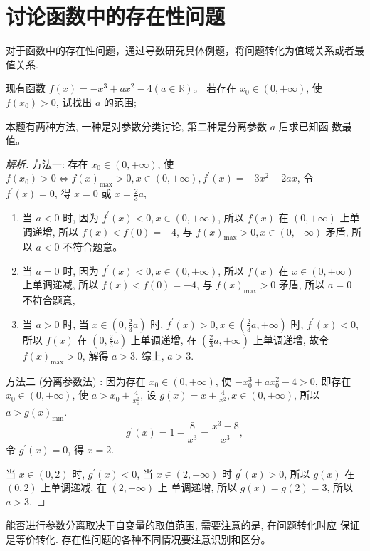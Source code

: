 \section{讨论函数中的存在性问题}

对于函数中的存在性问题，通过导数研究具体例题，将问题转化为值域关系或者最值关系.

\begin{example}
  现有函数 $f(x)=-x^{3}+a x^{2}-4(a \in \mathbb{R})$。 若存在 $x_{0} \in(0,+\infty)$, 使 $f\left(x_{0}\right)>0$, 试找出 $a$ 的范围;
\end{example}

\begin{analysis}
  本题有两种方法, 一种是对参数分类讨论, 第二种是分离参数 $a$ 后求已知函 数最值。
\end{analysis}


\begin{proof}[解析]
  方法一: 存在 $x_{0} \in(0,+\infty)$, 使 $f\left(x_{0}\right)>0 \Leftrightarrow f(x)_{\max }>0, x \in(0,+\infty), {f}^{\prime}({x})=-3 {x}^{2}+2 {ax}$, 令 $f^{\prime}(x)=0$, 得 $x=0$ 或 $x=\frac{2}{3} a$,
  \begin{enumerate}[(1)]
    \item 当 ${a}<0$ 时, 因为 $f^{\prime}(x)<0, x \in(0,+\infty)$, 所以 $f(x)$ 在 $(0,+\infty)$ 上单调递增,
    所以 ${f}({x})<{f}(0)=-4$, 与 ${f}({x})_{\max }>0, {x} \in(0,+\infty)$ 矛盾, 所以 ${a}<0$ 不符合题意。
    \item 当 ${a}=0$ 时, 因为 ${f}^{\prime}({x})<0, {x} \in(0,+\infty)$, 所以 ${f}({x})$ 在 ${x} \in(0,+\infty)$ 上单调递减,
    所以 ${f}({x})<{f}(0)=-4$, 与 ${f}({x})_{\max}>0$ 矛盾, 所以 ${a}=0$ 不符合题意,
    \item 当 ${a}>0$ 时, 当 $x \in\left(0, \frac{2}{3} a\right)$ 时, $f^{\prime}(x)>0, x \in\left(\frac{2}{3} a,+\infty\right)$ 时, $f^{\prime}(x)<0$, 所以 $f(x)$ 在 $\left(0, \frac{2}{3} a\right)$ 上单调递增, 在 $\left(\frac{2}{3} a,+\infty\right)$ 上单调递增, 故令 ${f}({x})_{\max} >0$, 解得 ${a}>3$. 综上, $a>3$.
  \end{enumerate}

  方法二 (分离参数法) :
  因为存在 $x_{0} \in(0,+\infty)$, 使 $-x_{0}^{3}+a x_{0}^{2}-4>0$, 即存在 $x_{0} \in(0,+\infty)$, 使 $a>x_{0}+\frac{4}{x_{0}^{2}}$, 设 $g(x)=x+\frac{4}{x^{2}}, x \in(0,+\infty)$, 所以 $a>g(x)_{\min}$. \[g^{\prime}(x)=1-\frac{8}{x^{3}}=\frac{x^{3}-8}{x^{3}},\] 令 ${g}^{\prime}({x})=0$, 得 ${x}=2$. 
  
  当 $x \in(0,2)$ 时, ${g}^{\prime}({x})<0$, 当 $x \in(2,+\infty)$ 时 $g^{\prime}(x)>0$, 所以 $g(x)$ 在 $(0,2)$ 上单调递减, 在 $(2,+\infty)$ 上 单调递增, 所以 ${g}({x})={g}(2)=3$, 所以 ${a}>3$.
\end{proof}

\begin{review}
  能否进行参数分离取决于自变量的取值范围, 需要注意的是, 在问题转化时应 保证是等价转化. 存在性问题的各种不同情况要注意识别和区分。
\end{review}